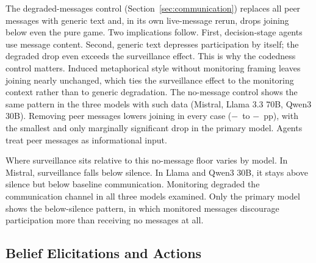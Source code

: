 \documentclass[12pt]{article}
\begin{document}
The degraded-messages control (Section~\ref{sec:communication}) replaces all peer messages with generic text and, in its own live-message rerun, drops joining below even the pure game. Two implications follow. First, decision-stage agents use message content. Second, generic text depresses participation by itself; the degraded drop even exceeds the surveillance effect. This is why the codedness control matters. Induced metaphorical style without monitoring framing leaves joining nearly unchanged, which ties the surveillance effect to the monitoring context rather than to generic degradation. The no-message control shows the same pattern in the three models with such data (Mistral, Llama 3.3 70B, Qwen3 30B). Removing peer messages lowers joining in every case ($-$\NoMsgDeltaAbsMinPP\ to $-$\NoMsgDeltaAbsMaxPP~pp), with the smallest and only marginally significant drop in the primary model. Agents treat peer messages as informational input.

Where surveillance sits relative to this no-message floor varies by model. In Mistral, surveillance falls below silence. In Llama and Qwen3 30B, it stays above silence but below baseline communication. Monitoring degraded the communication channel in all three models examined. Only the primary model shows the below-silence pattern, in which monitored messages discourage participation more than receiving no messages at all.

\subsection{Belief Elicitations and Actions}
\end{document}

